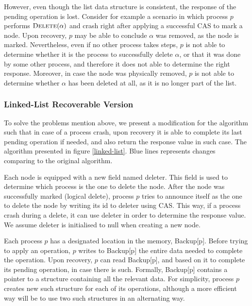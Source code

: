 However, even though the list data structure is consistent, the response of the pending operation is lost. Consider for example a scenario in which process $p$ performs $\mbox{\sc Delete}(\alpha)$ and crash right after applying a successful CAS to mark a node. Upon recovery, $p$ may be able to conclude $\alpha$ was removed, as the node is marked. Nevertheless, even if no other process takes steps, $p$ is not able to determine whether it is the process to successfully delete $\alpha$, or that it was done by some other process, and therefore it does not able to determine the right response. Moreover, in case the node was physically removed, $p$ is not able to determine whether $\alpha$ has been deleted at all, as it is no longer part of the list.


\subsubsection{Linked-List Recoverable Version}

To solve the problems mention above, we present a modification for the algorithm such that in case of a process crash, upon recovery it is able to complete its last pending operation if needed, and also return the response value in such case. The algorithm presented in figure \ref{linked-list}. Blue lines represents changes comparing to the original algorithm.

Each node is equipped with a new field named deleter. This field is used to determine which process is the one to delete the node. After the node was successfully marked (logical delete), process $p$ tries to announce itself as the one to delete the node by writing its id to deleter using CAS. This way, if a process crash during a delete, it can use deleter in order to determine the response value. We assume deleter is initialised to null when creating a new node.

Each process $p$ has a designated location in the memory, Backup[p]. Before trying to apply an operation, $p$ writes to Backup[p] the entire data needed to complete the operation. Upon recovery, $p$ can read Backup[p], and based on it to complete its pending operation, in case there is such. Formally, Backup[p] contains a pointer to a structure containing all the relevant data.
For simplicity, process $p$ creates new such structure for each of its operations, although a more efficient way will be to use two such structures in an alternating way. 


